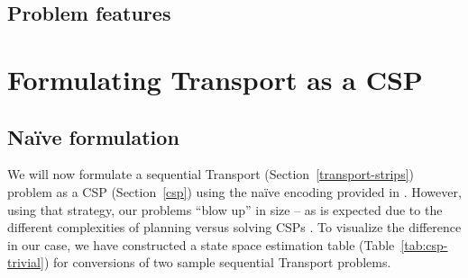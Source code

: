 \subsection{Problem features}

















\section{Formulating Transport as a CSP}


\subsection{Na{\"{i}}ve formulation}

We will now formulate a sequential Transport (Section~\ref{transport-strips}) problem as a CSP (Section~\ref{csp}) using the na{\"{i}}ve encoding provided in \citet[Section~8.3]{Ghallab2004}.
However, using that strategy, our problems ``blow up'' in size -- as is expected due
to the different complexities of planning versus solving CSPs \citep[Section~8.3.2]{Ghallab2004}. To visualize the difference in our case, we have constructed a state space estimation table (Table~\ref{tab:csp-trivial}) for conversions of two sample sequential Transport problems.

